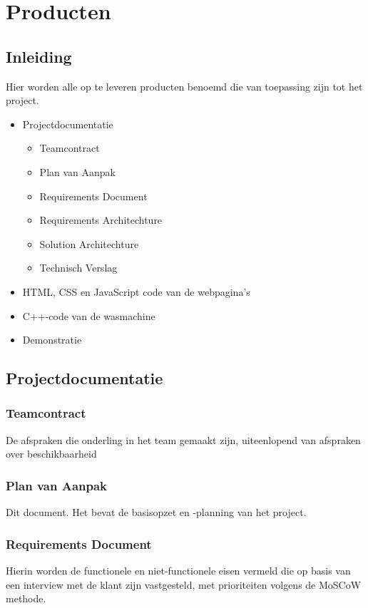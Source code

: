 \chapter{Producten}
\section{Inleiding}
Hier worden alle op te leveren producten benoemd die van toepassing zijn tot het project.
\begin{itemize}
	\item Projectdocumentatie
		\begin{itemize}
			\item Teamcontract
			\item Plan van Aanpak
			\item Requirements Document
			\item Requirements Architechture
			\item Solution Architechture
			\item Technisch Verslag
		\end{itemize}
	\item HTML, CSS en JavaScript code van de webpagina's
	\item C++-code van de wasmachine
	\item Demonstratie
\end{itemize}
\section{Projectdocumentatie}
\subsection{Teamcontract}
De afspraken die onderling in het team gemaakt zijn, uiteenlopend van afspraken over beschikbaarheid

\subsection{Plan van Aanpak}
Dit document. Het bevat de basisopzet en -planning van het project.

\subsection{Requirements Document}
Hierin worden de functionele en niet-functionele eisen vermeld die op basis van een interview met de klant zijn vastgesteld, met prioriteiten volgens de MoSCoW methode.


